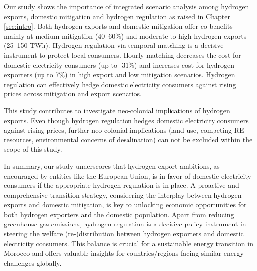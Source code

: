 



Our study shows the importance of integrated scenario analysis among hydrogen exports, domestic mitigation and hydrogen regulation as raised in Chapter \ref{sec:intro}.
Both hydrogen exports and domestic mitigation offer co-benefits mainly at medium mitigation (40--60\%) and moderate to high hydrogen exports (25--150 TWh). Hydrogen regulation via temporal matching is a decisive instrument
to protect local consumers. Hourly matching decreases the cost for domestic electricity consumers (up to -31\%) and increases cost for hydrogen exporters (up to 7\%) in high export and low mitigation scenarios. Hydrogen regulation can effectively hedge domestic electricity consumers against rising prices across mitigation and export scenarios. %

This study contributes to investigate neo-colonial implications of hydrogen exports. Even though hydrogen regulation hedges domestic electricity consumers against rising prices, further neo-colonial implications (land use, competing RE resources, environmental concerns of desalination) can not be excluded within the scope of this study.


In summary, our study underscores that hydrogen export ambitions, as encouraged by entities like the European Union, is in favor of domestic electricity consumers 
if the appropriate hydrogen regulation is in place. A proactive and comprehensive transition strategy, considering the interplay between hydrogen exports and domestic mitigation, is key to unlocking economic opportunities for both hydrogen exporters and the domestic population. 
Apart from reducing greenhouse gas emissions, hydrogen regulation is a decisive policy instrument in steering the welfare (re-)distribution between hydrogen exporters and domestic electricity consumers. 
This balance is crucial for a sustainable energy transition in Morocco and offers valuable insights for countries/regions facing similar energy challenges globally.



